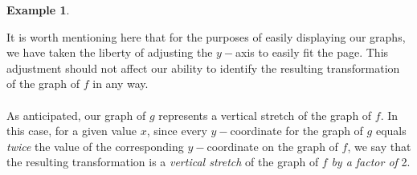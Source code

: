 \documentclass[11pt]{book}
\theoremstyle{definition}  %
\newtheorem{example}{Example}[chapter]
\begin{document}
\begin{example}
\begin{multicols}{2}
\begin{center}
\end{center} 
\end{multicols}
It is worth mentioning here that for the purposes of easily displaying our graphs, we have taken the liberty of adjusting the $y-$axis to easily fit the page.  This adjustment should not affect our ability to identify the resulting transformation of the graph of $f$ in any way.\\
~\\
As anticipated, our graph of $g$ represents a vertical stretch of the graph of $f$.  In this case, for a given value $x$, since every $y-$coordinate for the graph of $g$ equals \textit{twice} the value of the corresponding $y-$coordinate on the graph of $f$, we say that the resulting transformation is a \textit{vertical stretch} of the graph of $f$ \textit{by a factor of} 2. 
\end{example}
\end{document}
